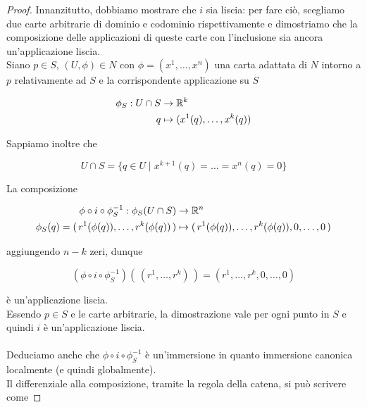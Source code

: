 \begin{proof}
	Innanzitutto, dobbiamo mostrare che $ i $ sia liscia: per fare ciò, scegliamo due carte arbitrarie di dominio e codominio rispettivamente e dimostriamo che la composizione delle applicazioni di queste carte con l'inclusione sia ancora un'applicazione liscia.\\
	Siano $ p \in S $, $ (U,\phi) \in N $ con $ \phi = (x^{1},\dots,x^{n}) $ una carta adattata di $ N $ intorno a $ p $ relativamente ad $ S $ e la corrispondente applicazione su $ S $
	
	\begin{align}
		\begin{split}
			\phi_{S} : U \cap S &\to \mathbb{R}^{k}\\
			q &\mapsto (x^{1}(q),\dots,x^{k}(q))
		\end{split}
	\end{align}
	
	Sappiamo inoltre che
	
	\begin{equation}
		U \cap S = \{ q \in U \mid x^{k+1}(q) = \dots = x^{n}(q) = 0 \}
	\end{equation}

	La composizione
	
	\begin{align}
		\begin{split}
			\phi \circ i \circ \phi_{S}^{-1} : \phi_{S}(U \cap S) &\to \mathbb{R}^{n}\\
			\phi_{S}(q) = (\, r^{1}(\phi(q)),\dots,r^{k}(\phi(q)) \,) &\mapsto (\, r^{1}(\phi(q)),\dots,r^{k}(\phi(q)),0,\dots,0 \,)
		\end{split}
	\end{align}
	
	aggiungendo $ n-k $ zeri, dunque
	
	\begin{equation}
		(\phi \circ i \circ \phi_{S}^{-1}) (\, (r^{1},\dots,r^{k}) \,) = (r^{1},\dots,r^{k},0,\dots,0)
	\end{equation}

	è un'applicazione liscia.\\	
	Essendo $ p \in S $ e le carte arbitrarie, la dimostrazione vale per ogni punto in $ S $ e quindi $ i $ è un'applicazione liscia.\\\\
	Deduciamo anche che $ \phi \circ i \circ \phi_{S}^{-1} $ è un'immersione in quanto immersione canonica localmente (e quindi globalmente).\\
	Il differenziale alla composizione, tramite la regola della catena, si può scrivere come
	

\end{proof}
